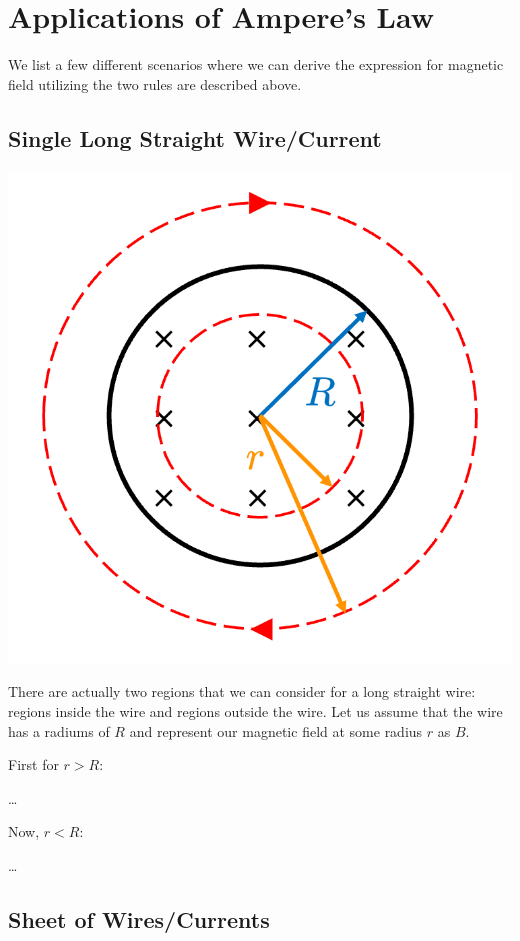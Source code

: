 \section{Applications of Ampere's Law}

We list a few different scenarios where we can derive the expression for magnetic field utilizing the two rules are described above.

\subsection{Single Long Straight Wire/Current}

\hfil \includegraphics[scale=0.4]{assets/amp-law-single-wire.png}

There are actually two regions that we can consider for a long straight wire: regions inside the wire and regions outside the wire. Let us assume that the wire has a radiums of $R$ and represent our magnetic field at some radius $r$ as $B$.

First for $r > R$:

\dots

Now, $r < R$:

\dots


\subsection{Sheet of Wires/Currents}

